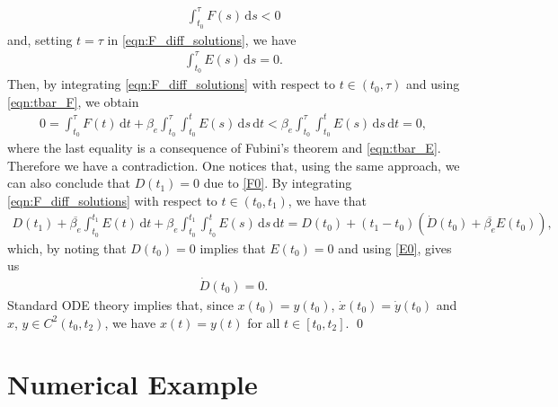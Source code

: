 \documentclass{article}
\newcommand{\ds}{\text{d}s}
\newcommand{\dt}{\text{d}t}
\newcommand{\be}{\beta_e}
\newcommand{\bb}{\overline{\be}}
\begin{document}
%
\begin{align}
    \label{eqn:tbar_F}
    \int_{t_0}^{\tau} F(s) \, \ds < 0
\end{align}
%
and, setting $t = \tau$ in \eqref{eqn:F_diff_solutions}, we have
%
\begin{align}
    \label{eqn:tbar_E}
    \int_{t_0}^{\tau} E(s) \, \ds = 0.
\end{align}
%
Then, by integrating \eqref{eqn:F_diff_solutions} with respect to $t \in (t_0,\tau)$ and using \eqref{eqn:tbar_F}, we obtain
%
\begin{align*}
    0 = \int_{t_0}^{\tau} F(t) \, \dt + \be \int_{t_0}^{\tau}\int_{t_0}^{t} E(s) \, \ds \, \dt < \be \int_{t_0}^{\tau}\int_{t_0}^{t} E(s) \, \ds \, \dt = 0, %
\end{align*}
%
where the last equality is a consequence of Fubini's theorem and \eqref{eqn:tbar_E}. Therefore we have a contradiction. One notices that, using the same approach, we can also conclude that $D(t_1) = 0$ due to \eqref{F0}. By integrating \eqref{eqn:F_diff_solutions} with respect to $t \in (t_0,t_1)$, we have that
%
\begin{align*}
    D(t_1) + \bb \int_{t_0}^{t_1} E(t) \, \dt + \be \int_{t_0}^{t_1} \int_{t_0}^{t} E(s) \, \ds \, \dt = D(t_0) + (t_1 - t_0) \left( \dot{D}(t_0) + \bb E(t_0) \right), %
\end{align*}
%
which, by noting that $D(t_0) = 0$ implies that $E(t_0) = 0$ and using \eqref{E0}, gives us
%
\begin{align*}
    \dot{D}(t_0) = 0. %
\end{align*}
%
Standard ODE theory implies that, since $x(t_0) = y(t_0)$, $\dot{x}(t_0) = \dot{y}(t_0)$ and $x$, $y \in C^2(t_0,t_2)$, we have $x(t) = y(t)$ for all $t \in [t_0,t_2]$.  \qed 

\section{Numerical Example}
\label{numerics}
\end{document}
